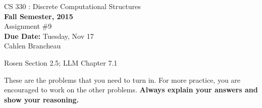 \documentclass[11pt]{article}
\begin{document}
\begin{center}
{{\large CS 330 : Discrete Computational Structures}}\\


{\bf Fall Semester, 2015}\\

{\sc Assignment \#9}\\
{\bf Due Date:}  Tuesday, Nov 17\\
Cahlen Brancheau
\end{center}

 Rosen Section 2.5; LLM Chapter 7.1

These are the problems that you need to turn in. For more
practice, you are encouraged to work on the other problems. {\bf Always
explain your answers and show your reasoning.}
\end{document}
